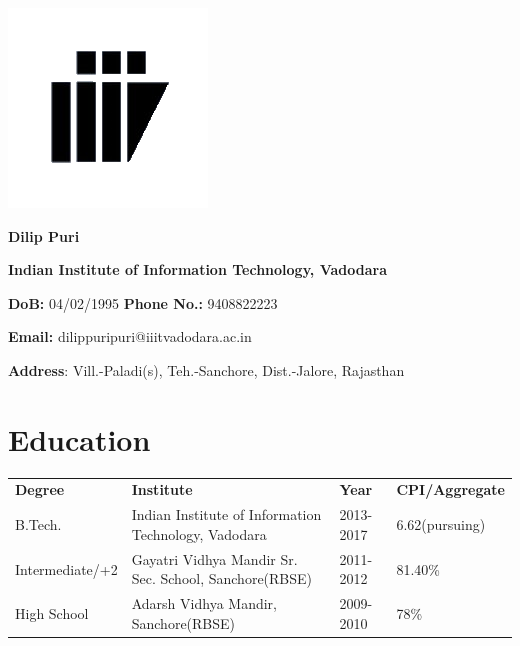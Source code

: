 \documentclass{article}
\begin{document}
\begin{minipage}{.1\textwidth}
\includegraphics[scale=0.6]{logo_iiitv.png}
\end{minipage}%
\begin{minipage}{1.5\textwidth}
\begin{large}
\hspace*{4cm}\textbf{Dilip Puri}\vspace*{2mm}

\hspace*{4cm}\textbf{Indian Institute of Information Technology, Vadodara}\vspace*{2mm}

\hspace*{4cm}\textbf{DoB:} 04/02/1995 \textbf{Phone No.:} 9408822223\vspace*{2mm}

\hspace*{4cm}\textbf{Email:} dilippuripuri@iiitvadodara.ac.in\vspace*{2mm}

\hspace*{4cm}\textbf{Address}: Vill.-Paladi(s), Teh.-Sanchore, Dist.-Jalore, Rajasthan
\end{large}    
\end{minipage}

\section{Education}
\vspace*{2mm}
\begin{tabular}{llll}
\textbf{Degree}&\textbf{Institute}&\textbf{Year}&\textbf{CPI/Aggregate}\vspace*{1mm} \\
B.Tech.& Indian Institute of Information Technology, Vadodara & 2013-2017 & 6.62(pursuing)\\
Intermediate/+2 & Gayatri Vidhya Mandir Sr. Sec. School, Sanchore(RBSE) & 2011-2012 & 81.40\%\\
High School & Adarsh Vidhya Mandir, Sanchore(RBSE) & 2009-2010 & 78\%\\
\end{tabular}
\end{document}
